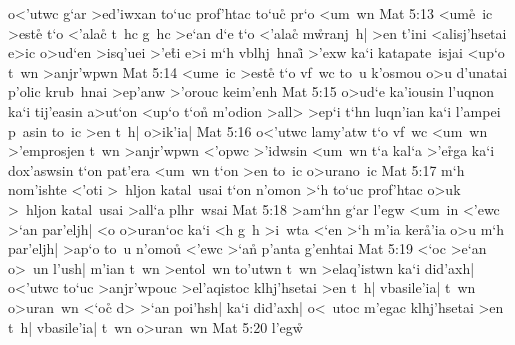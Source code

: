 o<'utwc
g`ar
>ed'iwxan
to`uc
prof'htac
to`uc\r{}
pr`o
<um~wn\bibvsend
\vs Mat 5:13
<um\r{e}~ic
>est\r{e}
t`o
<'ala\r{c}
t~hc
g~hc
>e`an
d`e
t`o
<'ala\r{c}
m\r{w}ranj~h|
>en
t'ini
<alisj'hsetai
e>ic
o>ud`en
>isq'uei
>'e\r{t}i
e>i
m`h
vblhj~hnai\r{}
>'exw
ka`i
katapate~isjai
<up`o
t~wn
>anjr'wpwn\bibvsend
\vs Mat 5:14
<ume~ic
>est\r{e}
t`o
vf~wc
to~u
k'osmou
o>u
d'unatai
p'olic
krub~hnai
>ep'anw
>'orouc
keim'enh\bibvsend
\vs Mat 5:15
o>ud`e
ka'iousin
l'uqnon
ka`i
tij'easin
a>ut`on
<up`o
t`o\r{n}
m'odion
>all>
>ep`i
t`hn
luqn'ian
ka`i
l'ampei
p~asin
to~ic
>en
t~h|
o>ik'ia|\bibvsend
\vs Mat 5:16
o<'utwc
lamy'atw
t`o
vf~wc
<um~wn
>'emprosjen
t~wn
>anjr'wpwn
<'opwc
>'idwsin
<um~wn
t`a
kal`a
>'e\r{r}ga
ka`i
dox'aswsin
t`on
pat'era
<um~wn
t`on
>en
to~ic
o>urano~ic\bibvsend
\vs Mat 5:17
m`h
nom'ishte
<'oti
>~hljon
katal~usai
t`on
n'omon
>`h
to`uc
prof'htac
o>uk
>~hljon
katal~usai
>all`a
plhr~wsai\bibvsend
\vs Mat 5:18
>am`hn
g`ar
l'egw
<um~in
<'ewc
>`an
par'eljh|
<o
o>uran`oc
ka`i
<h
g~h
>i~wta
<`en
>`h
m'ia
ker\r{a}'ia
o>u
m`h
par'eljh|
>ap`o
to~u
n'omo\r{u}
<'ewc
>`an\r{}
p'anta
g'enhtai\bibvsend
\vs Mat 5:19
<`oc
>e`an
o>~un
l'ush|
m'ian
t~wn
>entol~wn
to'utwn
t~wn
>elaq'istwn
ka`i
did'axh|
o<'utwc
to`uc
>anjr'wpouc
>el'aqistoc
klhj'hsetai
>en
t~h|
vbasile'ia|
t~wn
o>uran~wn
<`oc\r{}
d>
>`an
poi'hsh|
ka`i
did'axh|
o<~utoc
m'egac
klhj'hsetai
>en
t~h|
vbasile'ia|
t~wn
o>uran~wn\bibvsend
\vs Mat 5:20
l'egw\r{}
